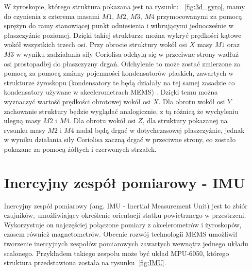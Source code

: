W żyroskopie, którego struktura pokazana jest na rysunku ~\ref{fig:3d_gyro}, mamy do czynienia z czterema masami $M1$, $M2$, $M3$, $M4$ przymocowanymi za pomocą sprężyn do ramy stanowiącej punkt odniesienia i wibrującymi jednocześnie w płaszczyźnie poziomej. Dzięki takiej strukturze można wykryć prędkości kątowe wokół wszystkich trzech osi. Przy obrocie struktury wokół osi $X$ masy $M1$ oraz $M3$ w wyniku zadziałania siły Coriolisa odchylą się w przeciwne strony wzdłuż osi prostopadłej do płaszczyzny drgań. Odchylenie to może zostać zmierzone za pomocą za pomocą zmiany pojemności kondensatorów płaskich, zawartych w strukturze żyroskopu (kondensatory te będą działały na tej samej zasadzie co kondensatory używane w akcelerometrach MEMS) . Dzięki temu można wyznaczyć wartość prędkości obrotowej wokół osi $X$. Dla obrotu wokół osi $Y$ zachowanie struktury będzie wyglądać analogicznie, z tą różnicą że wychyleniu ulegną masy $M2$ i $M4$. Dla obrotu wokół osi $Z$, dla struktury pokazanej na rysunku masy $M2$ i $M4$ nadal będą drgać w dotychczasowej płaszczyźnie, jednak w wyniku działania siły Coriolisa zaczną drgać w przeciwne strony, co zostało pokazane za pomocą żółtych i czerwonych strzałek.



\section{Inercyjny zespół pomiarowy - IMU}

Inercyjny zespół pomiarowy (ang. IMU - Inertial Measurement Unit) jest to zbiór czujników, umożliwiający określenie orientacji statku powietrznego w przestrzeni. Wykorzystuje on najczęściej połączone pomiary z akcelerometrów i żyroskopów, czasem również magnetometrów. Obecnie rozwój technologii MEMS umożliwił tworzenie inercyjnych zespołów pomiarowych zawartych wewnątrz jednego układu scalonego. Przykładem takiego zespołu może być układ MPU-6050, którego struktura przedstawiona została na rysunku~\ref{fig:IMU}.

